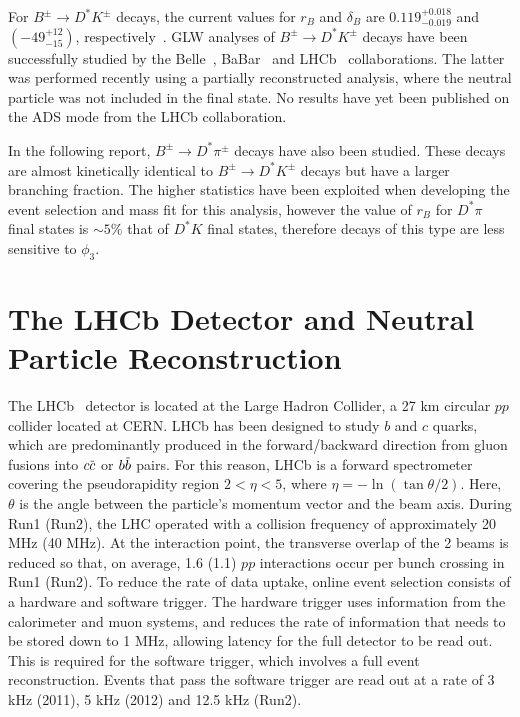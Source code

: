 \documentclass[oneside,12pt]{article}
\newcommand{\overbar}[1]{\mkern 1.5mu\overline{\mkern-1.5mu#1\mkern-1.5mu}\mkern
1.5mu}
\begin{document}
For $B^{\pm}\rightarrow D^{*}K^{\pm}$ decays, the
current values for $r_B$ and $\delta_B$ are $0.119^{+0.018}_{-0.019}$ and
$(-49^{+12}_{-15})$\degree, respectively~\cite{website:CKMFitter}. GLW analyses
of $B^{\pm}\rightarrow D^{*}K^{\pm}$ decays have been successfully studied by
the Belle~\cite{BelleGLW}, BaBar~\cite{BaBarGLW} and LHCb~\cite{PartReco}
collaborations. The latter was performed recently using a partially
reconstructed analysis, where the neutral particle was not included in the final
state. No results have yet been published on the ADS mode from the LHCb
collaboration.   

In the following report, $B^{\pm}\rightarrow D^{*}\pi^{\pm}$ decays have also
been studied. These decays are almost kinetically identical to
$B^{\pm}\rightarrow D^{*}K^{\pm}$ decays but have a larger branching fraction.
The higher statistics have been exploited when developing the event selection
and mass fit for this analysis, however the value of $r_B$ for $D^*\pi$ final
states is $\sim 5\%$ that of $D^*K$ final states, therefore decays of this
type are less sensitive to $\phi_3$.

\vspace{-3mm}
\section{The LHCb Detector and Neutral Particle Reconstruction} \label{sec:detector}
The LHCb~\cite{LHCbDetector} detector is located at the Large Hadron Collider, a
27 km circular $pp$ collider located at CERN. LHCb has been designed to study
$b$ and $c$ quarks, which are predominantly produced in the forward/backward
direction from gluon fusions into $c\overbar{c}$ or $b\overbar{b}$ pairs. For
this reason, LHCb is a forward spectrometer covering the pseudorapidity region
$2 < \eta < 5$, where $\eta = -\ln (\tan \theta / 2)$.  Here, $\theta$ is the
angle between the particle's momentum vector and the beam axis. During Run1
(Run2), the LHC operated with a collision frequency of approximately 20 MHz (40
MHz). At the interaction point, the transverse overlap of the 2 beams is reduced
so that, on average, 1.6 (1.1) $pp$ interactions occur per bunch crossing in
Run1 (Run2). To reduce the rate of data uptake, online event selection consists
of a hardware and software trigger. The hardware trigger uses information from
the calorimeter and muon systems, and reduces the rate of information that needs
to be stored down to 1 MHz, allowing latency for the full detector to be read
out. This is required for the software trigger, which involves a full event
reconstruction.  Events that pass the software trigger are read out at a rate of
3 kHz (2011), 5 kHz (2012) and 12.5 kHz (Run2).
\end{document}
